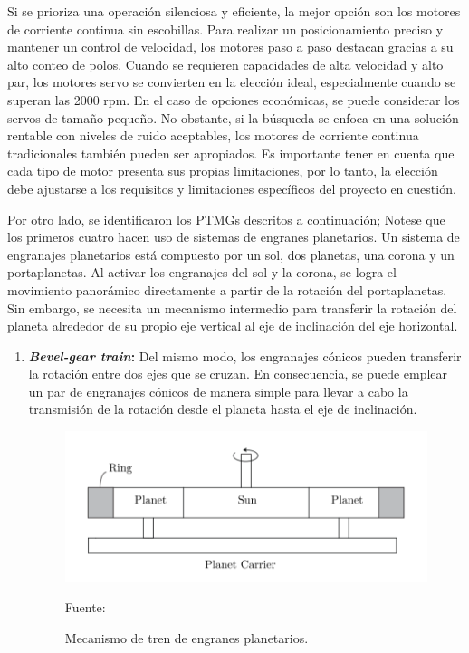 \begin{enumerate}[label=\alph*)]
    Si se prioriza una operación silenciosa y eficiente, la mejor opción son los motores de corriente continua sin escobillas. Para realizar un posicionamiento preciso y mantener un control de velocidad, los motores paso a paso destacan gracias a su alto conteo de polos. Cuando se requieren capacidades de alta velocidad y alto par, los motores servo se convierten en la elección ideal, especialmente cuando se superan las 2000 rpm. En el caso de opciones económicas, se puede considerar los servos de tamaño pequeño. No obstante, si la búsqueda se enfoca en una solución rentable con niveles de ruido aceptables, los motores de corriente continua tradicionales también pueden ser apropiados. Es importante tener en cuenta que cada tipo de motor presenta sus propias limitaciones, por lo tanto, la elección debe ajustarse a los requisitos y limitaciones específicos del proyecto en cuestión.

    Por otro lado, se identificaron los PTMGs descritos a continuación; Notese que los primeros cuatro hacen uso de sistemas de engranes planetarios. Un sistema de engranajes planetarios está compuesto por un sol, dos planetas, una corona y un portaplanetas. Al activar los engranajes del sol y la corona, se logra el movimiento panorámico directamente a partir de la rotación del portaplanetas. Sin embargo, se necesita un mecanismo intermedio para transferir la rotación del planeta alrededor de su propio eje vertical al eje de inclinación del eje horizontal.
    
    \needspace{4cm}
    \begin{enumerate}[label=\Roman*)]
    \item \textbf{\textit{Bevel-gear train}:} Del mismo modo, los engranajes cónicos pueden transferir la rotación entre dos ejes que se cruzan. En consecuencia, se puede emplear un par de engranajes cónicos de manera simple para llevar a cabo la transmisión de la rotación desde el planeta hasta el eje de inclinación.

    \begin{figure}[H]
    \centering
    \begin{adjustbox}{width=\linewidth/2}
      \includegraphics{media/planet_gear.png}
    \end{adjustbox}
    \caption{\label{fig:planet_gear_mechanism}Mecanismo de tren de engranes planetarios.}
    Fuente: \textcite{Yosafat2017}
    \end{figure}
    

\end{enumerate}
\end{enumerate}
